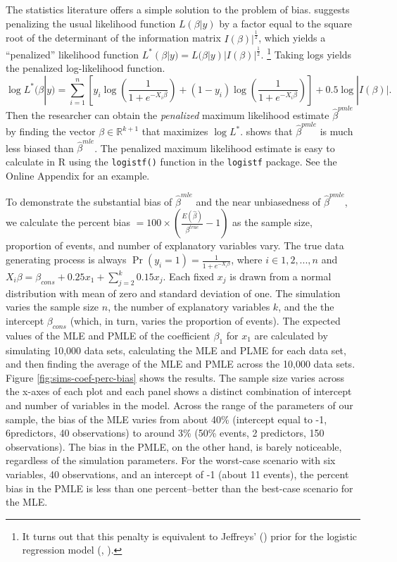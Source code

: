 \documentclass[12pt]{article}
\begin{document}
The statistics literature offers a simple solution to the problem of bias. 
\citet{Firth1993} suggests penalizing the usual likelihood function $L(\beta | y)$ by a factor equal to the square root of the determinant of the information matrix $I(\beta)|^\frac{1}{2}$, which yields a ``penalized'' likelihood function $L^*(\beta | y) = L(\beta | y)|I(\beta)|^\frac{1}{2}$.
\footnote{It turns out that this penalty is equivalent to Jeffreys' (\citeyear{Jeffreys1946}) prior for the logistic regression model (\citealt{Firth1993}, \citealt{Poirier1994}).} 
Taking logs yields the penalized log-likelihood function.
\begin{equation}\nonumber
\log L^*(\beta | y) = \displaystyle \sum_{i = 1}^n \left[y_i \log \left( \dfrac{1}{1 + e^{-X_i\beta}}\right) + (1 - y_i) \log \left( \dfrac{1}{1 + e^{-X_i\beta}}\right)\right] + 0.5 \log |I(\beta)|.
\end{equation}
Then the researcher can obtain the \emph{penalized} maximum likelihood estimate $\hat{\beta}^{pmle}$ by finding the vector $\beta \in \mathbb{R}^{k + 1}$ that maximizes $\log L^*$. \citet{Firth1993} shows that $\hat{\beta}^{pmle}$ is much less biased than $\hat{\beta}^{mle}$. The penalized maximum likelihood estimate is easy to calculate in R using the \texttt{logistf()} function in the \texttt{logistf} package. See the Online Appendix for an example.

To demonstrate the substantial bias of $\hat{\beta}^{mle}$ and the near unbiasedness of $\hat{\beta}^{pmle}$, we calculate the percent bias $= 100 \times \left(\frac{E(\hat{\beta})}{\beta^{true}} - 1 \right)$ as the sample size, proportion of events, and number of explanatory variables vary. The true data generating process is always $\Pr(y_i = 1) = \frac{1}{1 + e^{-X_i \beta}}$, where $i \in 1, 2,..., n$ and $X_i \beta = \beta_{cons} + 0.25 x_1 + \sum_{j = 2}^k 0.15 x_j$. Each fixed $x_j$ is drawn from a normal distribution with mean of zero and standard deviation of one. The simulation varies the sample size $n$, the number of explanatory variables $k$, and the the intercept $\beta_{cons}$ (which, in turn, varies the proportion of events). The expected values of the MLE  and PMLE of the coefficient $\beta_1$ for $x_1$ are calculated by simulating 10,000 data sets, calculating the MLE and PLME for each data set, and then finding the average of the MLE and PMLE across the 10,000 data sets. Figure \ref{fig:sims-coef-perc-bias} shows the results. The sample size varies across the x-axes of each plot and each panel shows a distinct combination of intercept and number of variables in the model. Across the range of the parameters of our sample, the bias of the MLE varies from about 40\% (intercept equal to -1, 6predictors, 40 observations) to around 3\% (50\% events, 2 predictors, 150 observations). The bias in the PMLE, on the other hand, is barely noticeable, regardless of the simulation parameters. For the worst-case scenario with six variables, 40 observations, and an intercept of -1 (about 11 events), the percent bias in the PMLE is less than one percent--better than the best-case scenario for the MLE.
\end{document}
